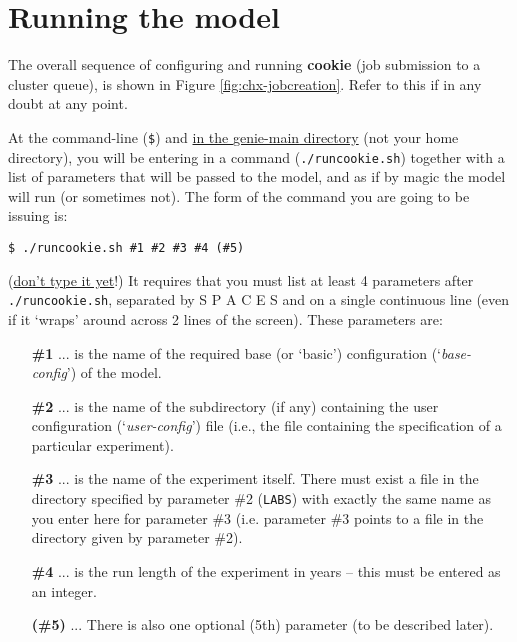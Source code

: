 \newpage

\section{Running the model}

The overall sequence of configuring and running \textbf{cookie} (job submission to a cluster queue), is shown in Figure \ref{fig:chx-jobcreation}. Refer to this if in any doubt at any point.

At the command-line (\texttt{\$}) and \uline{in the \textsf{\footnotesize genie-main} directory} (not your home directory), you will be entering in a command (\texttt{./runcookie.sh}) together with a list of parameters that will be passed to the model, and as if by magic the model will run (or sometimes not). The form of the command you are going to be issuing is:

\vspace{-1mm}
\begin{verbatim}
$ ./runcookie.sh #1 #2 #3 #4 (#5)
\end{verbatim}
\vspace{-1mm}

\noindent(\uline{don't type it yet}!) It requires that you must list at least 4 parameters after \texttt{./runcookie.sh}, separated by S P A C E S and on a single continuous line (even if it ‘wraps’ around across 2 lines of the screen).
These parameters are:

\vspace{2mm}
\begin{enumerate}[noitemsep]
\setlength{\itemindent}{.2in}
\item[\textbf{\#1}] ... is the name of the required base (or ‘basic’) configuration (‘\textit{base-config}’) of the model.
\item[\textbf{\#2}] ... is the name of the subdirectory (if any) containing the user configuration (‘\textit{user-config}’) file (i.e., the file containing the specification of a particular experiment).
\item[\textbf{\#3}] ... is the name of the experiment itself. There must exist a file in the directory specified by parameter \#2 (\texttt{LABS}) with exactly the same name as you enter here for parameter \#3 (i.e. parameter \#3 points to a file in the directory given by parameter \#2).
\item[\textbf{\#4}] ... is the run length of the experiment in years – this must be entered as an integer.
\item[\textbf{(\#5)}] ... There is also one optional (5th) parameter (to be described later).
\end{enumerate}

